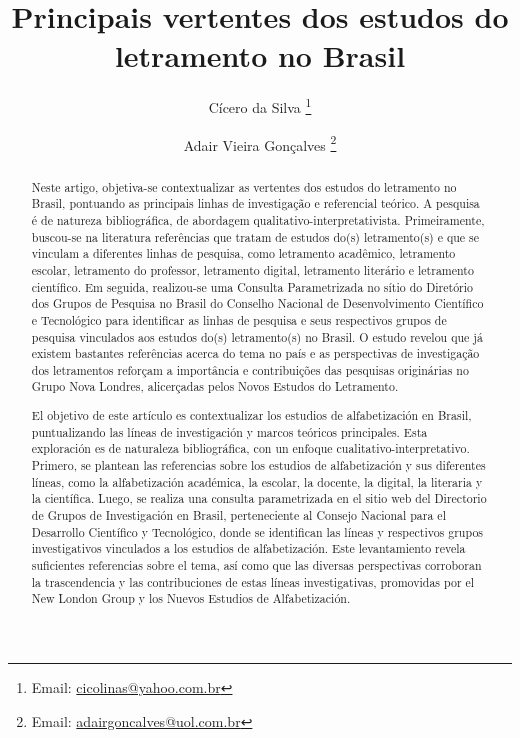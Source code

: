 \documentclass{textolivre}
\title{Principais vertentes dos estudos do letramento no Brasil}
\author[1]{Cícero da Silva \orcid{0000-0001-6071-6711} \thanks{Email: \url{cicolinas@yahoo.com.br}}}
\author[2]{Adair Vieira Gonçalves \orcid{0000-0003-4998-9692} \thanks{Email: \url{adairgoncalves@uol.com.br}}}
\affil[1]{Universidade Federal do Tocantins, Brasil.}
\affil[2]{Universidade Federal da Grande Dourados, Brasil.}
\begin{document}
\maketitle

\begin{polyabstract}
\begin{abstract}
Neste artigo, objetiva-se contextualizar as vertentes dos estudos do letramento no Brasil, pontuando as principais linhas de investigação e referencial teórico. A pesquisa é de natureza bibliográfica, de abordagem qualitativo-interpretativista. Primeiramente, buscou-se na literatura referências que tratam de estudos do(s) letramento(s) e que se vinculam a diferentes linhas de pesquisa, como letramento acadêmico, letramento escolar, letramento do professor, letramento digital, letramento literário e letramento científico. Em seguida, realizou-se uma Consulta Parametrizada no sítio do Diretório dos Grupos de Pesquisa no Brasil do Conselho Nacional de Desenvolvimento Científico e Tecnológico para identificar as linhas de pesquisa e seus respectivos grupos de pesquisa vinculados aos estudos do(s) letramento(s) no Brasil. O estudo revelou que já existem bastantes referências acerca do tema no país e as perspectivas de investigação dos letramentos reforçam a importância e contribuições das pesquisas originárias no Grupo Nova Londres, alicerçadas pelos Novos Estudos do Letramento.

\end{abstract}

\begin{spanish}
\begin{abstract}
El objetivo de este artículo es contextualizar los estudios de alfabetización en Brasil, puntualizando las líneas de investigación y marcos teóricos principales. Esta exploración es de naturaleza bibliográfica, con un enfoque cualitativo-interpretativo. Primero, se plantean las referencias sobre los estudios de alfabetización y sus diferentes líneas, como la alfabetización académica, la escolar, la docente, la digital, la literaria y la científica. Luego, se realiza una consulta parametrizada en el sitio web del Directorio de Grupos de Investigación en Brasil, perteneciente al Consejo Nacional para el Desarrollo Científico y Tecnológico, donde se identifican las líneas y respectivos grupos investigativos vinculados a los estudios de alfabetización. Este levantamiento revela suficientes referencias sobre el tema, así como que las diversas perspectivas corroboran la trascendencia y las contribuciones de estas líneas investigativas, promovidas por el New London Group y los Nuevos Estudios de Alfabetización.


\end{abstract}
\end{spanish}
\end{polyabstract}
\end{document}
